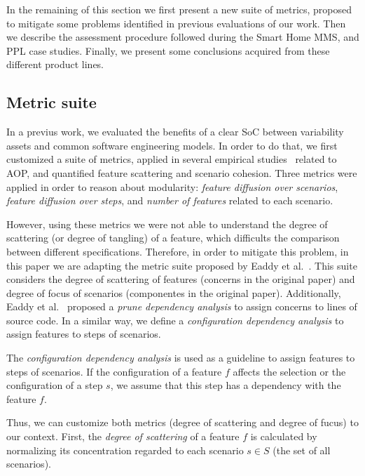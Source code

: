 \documentclass{acm_proc_article-sp}
\begin{document}
In the remaining of this section we first present a new suite of metrics,
proposed to mitigate some problems identified in previous evaluations of our
work. Then we describe the assessment procedure followed during the Smart Home
MMS, and PPL case studies. Finally, we present some conclusions acquired from
these different product lines.

\subsection{Metric suite}\label{sub:metric-suite}

In a previus work, we evaluated the benefits of a clear SoC between variability
assets and common software engineering models. In order to do that, we first
customized a suite of metrics, applied in several empirical
studies~\cite{Garcia:2005aa,Greenwood:2007aa,Figueiredo:2008ab,Figueiredo:2008ab}
related to AOP, and quantified feature scattering and scenario cohesion. Three
metrics were applied in order to reason about modularity: \emph{feature diffusion
over scenarios}, \emph{feature diffusion over steps}, and \emph{number of
features} related to each scenario.

However, using these metrics we were not able to understand the degree of
scattering (or degree of tangling) of a feature, which difficults the comparison
between different specifications. Therefore, in order to mitigate this problem,
in this paper we are adapting the metric suite proposed by Eaddy et
al.~\cite{Eaddy:2007aa}. This suite considers the degree of scattering of
features (concerns in the original paper) and degree of focus of scenarios
(componentes in the original paper). Additionally, Eaddy et
al.~\cite{Eaddy:2007aa} proposed a \emph{prune dependency analysis} to assign
concerns to lines of source code. In a similar way, we define a
\emph{configuration dependency analysis} to assign features to steps of
scenarios.

\begin{definition}
The \emph{configuration dependency analysis} is used as a guideline to assign
features to steps of scenarios. If the configuration of a feature $f$
affects the selection or the configuration of a step $s$, we assume that this step has a
dependency with the feature $f$. 
\end{definition}

Thus, we can customize both metrics (degree of scattering and degree of fucus)
to our context. First, the \emph{degree of scattering} of a feature $f$ is
calculated by normalizing its concentration regarded to each scenario $s \in
S$ (the set of all scenarios). 
\end{document}
